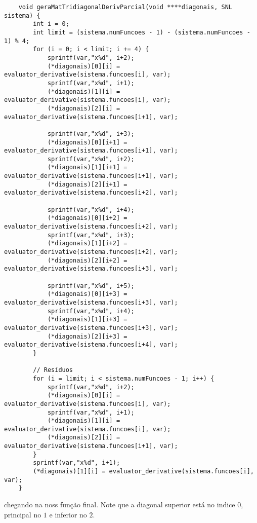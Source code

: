 \documentclass[10pt,a4paper]{article}
\begin{document}
	\begin{lstlisting}
	void geraMatTridiagonalDerivParcial(void ****diagonais, SNL sistema) {
		int i = 0;
		int limit = (sistema.numFuncoes - 1) - (sistema.numFuncoes - 1) % 4; 
		for (i = 0; i < limit; i += 4) {
			sprintf(var,"x%d", i+2);
			(*diagonais)[0][i] = evaluator_derivative(sistema.funcoes[i], var);
			sprintf(var,"x%d", i+1);
			(*diagonais)[1][i] = evaluator_derivative(sistema.funcoes[i], var);
			(*diagonais)[2][i] = evaluator_derivative(sistema.funcoes[i+1], var);
			
			sprintf(var,"x%d", i+3);
			(*diagonais)[0][i+1] = evaluator_derivative(sistema.funcoes[i+1], var);
			sprintf(var,"x%d", i+2);
			(*diagonais)[1][i+1] = evaluator_derivative(sistema.funcoes[i+1], var);
			(*diagonais)[2][i+1] = evaluator_derivative(sistema.funcoes[i+2], var);
			
			sprintf(var,"x%d", i+4);
			(*diagonais)[0][i+2] = evaluator_derivative(sistema.funcoes[i+2], var);
			sprintf(var,"x%d", i+3);
			(*diagonais)[1][i+2] = evaluator_derivative(sistema.funcoes[i+2], var);
			(*diagonais)[2][i+2] = evaluator_derivative(sistema.funcoes[i+3], var);
			
			sprintf(var,"x%d", i+5);
			(*diagonais)[0][i+3] = evaluator_derivative(sistema.funcoes[i+3], var);
			sprintf(var,"x%d", i+4);
			(*diagonais)[1][i+3] = evaluator_derivative(sistema.funcoes[i+3], var);
			(*diagonais)[2][i+3] = evaluator_derivative(sistema.funcoes[i+4], var);
		}
		
		// Resíduos
		for (i = limit; i < sistema.numFuncoes - 1; i++) {
			sprintf(var,"x%d", i+2);
			(*diagonais)[0][i] = evaluator_derivative(sistema.funcoes[i], var);
			sprintf(var,"x%d", i+1);
			(*diagonais)[1][i] = evaluator_derivative(sistema.funcoes[i], var);
			(*diagonais)[2][i] = evaluator_derivative(sistema.funcoes[i+1], var);
		}
		sprintf(var,"x%d", i+1);
		(*diagonais)[1][i] = evaluator_derivative(sistema.funcoes[i], var);
	}
	\end{lstlisting}
	chegando na noss função final. Note que a diagonal superior está no indice $ 0 $, principal no $ 1 $ e inferior no $ 2 $.
\end{document}
